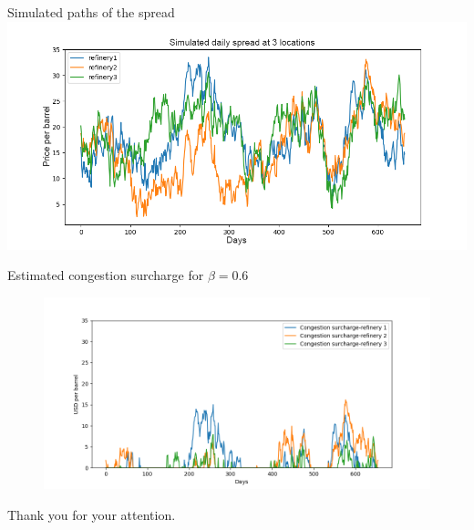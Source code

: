 \documentclass[aspectratio = 169]{beamer}
\begin{document}
\begin{frame}{Simulated paths of the spread}
\includegraphics[width=\linewidth]{simulated spread (1).png}
\end{frame}



\begin{frame}{Estimated congestion surcharge for $\beta = 0.6$}
\begin{figure}
    \includegraphics[scale = 0.55]{3node_beta.6.png}
\end{figure}
\end{frame}


\begin{frame}[c]{}
    \begin{center}
        \huge{Thank you for your attention.}
    \end{center}
\end{frame}
\end{document}
